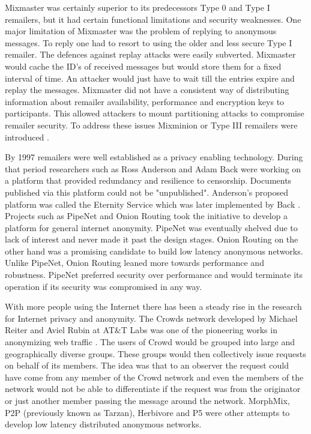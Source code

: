 \documentclass{llncs}
\begin{document}
Mixmaster was certainly superior to its predecessors Type 0 and Type I remailers, but it had certain functional limitations and security weaknesses. One major limitation of Mixmaster was the problem of replying to anonymous messages. To reply one had to resort to using the older and less secure Type I remailer. The defences against replay attacks were easily subverted. Mixmaster would cache the ID's of received messages but would store them for a fixed interval of time. An attacker would just have to wait till the entries expire and replay the messages. Mixmaster did not have a consistent way of distributing information about remailer availability, performance and encryption keys to participants. This allowed attackers to mount partitioning attacks to compromise remailer security. To address these issues Mixminion or Type III remailers were introduced \cite{minion-design}.

By 1997 remailers were well established as a privacy enabling technology. During that period researchers such as Ross Anderson and Adam Back were working on a platform that provided redundancy and resilience to censorship. Documents published via this platform could not be "unpublished". Anderson's proposed platform was called the Eternity Service \cite{anderson96eternity} which was later implemented by Back \cite{back:usenet}. Projects such as PipeNet\cite{pipenet10} and Onion Routing \cite{onion-routing:ih96} took the initiative to develop a platform for general internet anonymity. PipeNet was eventually shelved due to lack of interest and never made it past the design stages. Onion Routing on the other hand was a promising candidate to build low latency anonymous networks. Unlike PipeNet, Onion Routing leaned more towards performance and robustness. PipeNet preferred security over performance and would terminate its operation if its security was compromised in any way.

With more people using the Internet there has been a steady rise in the research for Internet privacy and anonymity. The Crowds network developed by Michael Reiter and Aviel Rubin at AT\&T Labs was one of the pioneering works in anonymizing web traffic \cite{crowds:tissec}. The users of Crowd would be grouped into large and geographically diverse groups. These groups would then collectively issue requests on behalf of its members. The idea was that to an observer the request could have come from any member of the Crowd network and even the members of the network would not be able to differentiate if the request was from the originator or just another member passing the message around the network. MorphMix\cite{morphmix:wpes2002}, P2P (previously known as Tarzan)\cite{tarzan:ccs02}, Herbivore\cite{herbivore:tr} and P5\cite{sherwood-protocol} were other attempts to develop low latency distributed anonymous networks.
\end{document}
